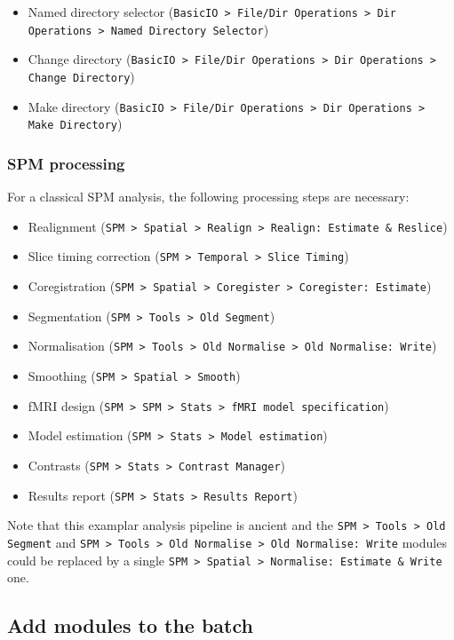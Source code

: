 \begin{itemize}
\item Named directory selector (\texttt{BasicIO > File/Dir Operations > Dir Operations > Named Directory Selector})
\item Change directory (\texttt{BasicIO > File/Dir Operations > Dir Operations > Change Directory})
\item Make directory (\texttt{BasicIO > File/Dir Operations > Dir Operations > Make Directory})
\end{itemize}

\subsubsection{SPM processing}

For a classical SPM analysis, the following processing steps are necessary:

\begin{itemize}
\item Realignment (\texttt{SPM > Spatial > Realign > Realign: Estimate \& Reslice})
\item Slice timing correction (\texttt{SPM > Temporal > Slice Timing})
\item Coregistration (\texttt{SPM > Spatial > Coregister > Coregister: Estimate})
\item Segmentation (\texttt{SPM > Tools > Old Segment})
\item Normalisation (\texttt{SPM > Tools > Old Normalise > Old Normalise: Write})
\item Smoothing (\texttt{SPM > Spatial > Smooth})
\item fMRI design (\texttt{SPM > SPM > Stats > fMRI model specification})
\item Model estimation (\texttt{SPM > Stats > Model estimation})
\item Contrasts (\texttt{SPM > Stats > Contrast Manager})
\item Results report (\texttt{SPM > Stats > Results Report})
\end{itemize}

Note that this examplar analysis pipeline is ancient and the \texttt{SPM > Tools > Old Segment} and \texttt{SPM > Tools > Old Normalise > Old Normalise: Write} modules could be replaced by a single \texttt{SPM > Spatial > Normalise: Estimate \& Write} one.

\subsection{Add modules to the batch}

